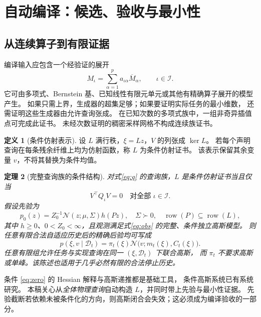 \documentclass[11pt,a4paper]{article}
\numberwithin{equation}{section}
\newtheorem{theorem}{定理}[section]
\theoremstyle{definition}
\newtheorem{definition}[theorem]{定义}
\newcommand{\N}{\mathcal N}
\newcommand{\D}{\mathcal D}
\DeclareMathOperator{\row}{row}
\begin{document}
\section{自动编译：候选、验收与最小性}
\label{sec:compile}

\subsection{从连续算子到有限证据}
编译输入应包含一个经验证的展开
\begin{equation}
 M_\iota=\sum_{\alpha=1}^{p}a_{\iota\alpha}\overline M_\alpha,
 \qquad \iota\in\mathcal I .
 \label{eq:generators}
\end{equation}
它可由多项式、Bernstein 基、已知线性有限元单元或其他有精确算子展开的模型产生。
如果只需上界，生成器的超集足够；如果要证明实际任务的最小维数，
还需证明这些生成器由允许查询张成。
在已知次数的多项式族中，一组非奇异插值点可完成此证书。
未经次数证明的稠密采样网格不构成连续族证书。

\begin{definition}[条件仿射表示]
设 \(L\) 满行秩，\(\xi=Lz\)，\(V\) 的列张成 \(\ker L\)。
若每个声明查询在每条残余纤维上均为仿射函数，称 \(L\) 为条件仿射证书。
该表示保留其余变量 \(v\)，不将其替换为条件均值。
\end{definition}

\begin{theorem}[完整查询族的条件结构]
\label{thm:compiler}
对式\eqref{eq:q} 的查询族，\(L\) 是条件仿射证书当且仅当
\begin{equation}
 V^\top Q_\iota V=0\quad\text{对全部 }\iota\in\mathcal I .
 \label{eq:zero}
\end{equation}
假设先验为
\begin{equation}
 p_0(z)=Z_0^{-1}\N(z;\mu,\Sigma)h(Pz),\quad
 \Sigma\succ0,\quad \row(P)\subseteq\row(L),
 \label{eq:prior}
\end{equation}
其中 \(h\ge0\)、\(0<Z_0<\infty\)，且观测满足式\eqref{eq:obs} 的完整、条件独立高斯模型。
则任意有限合法自适应历史后的精确后验均可写成
\begin{equation}
 p(\xi,v\mid\D_t)=\pi_t(\xi)\N\bigl(v;m_t(\xi),C_t(\xi)\bigr).
 \label{eq:posterior}
\end{equation}
任意有限组允许任务与实现查询在同一 \((\xi,\D_t)\) 下联合高斯，
而 \(\pi_t\) 不要求高斯或单峰。该陈述也适用于几乎必然有限的合法停止历史。
\end{theorem}

条件 \eqref{eq:zero} 的 Hessian 解释与高斯递推都是基础工具，
条件高斯系统已有系统研究\cite{chen2018}。
本稿关心从\emph{全体物理查询}自动构造 \(L\)，并同时带上先验与最小性证据。
先验截断若依赖未被条件化的方向，则高斯闭合会失效；这必须成为编译验收的一部分。
\end{document}
